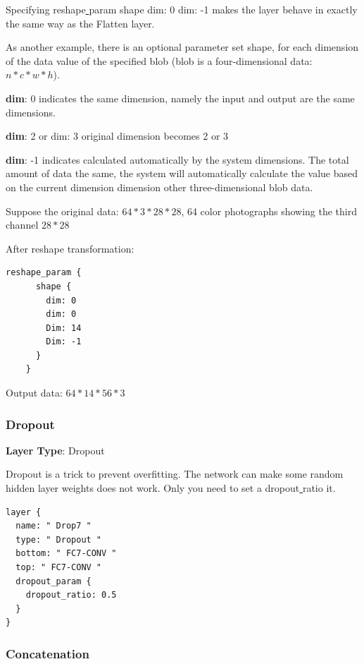 \documentclass[12pt]{article}
\begin{document}
Specifying reshape\underline{{ }{ }}param { shape { dim: 0 dim: -1 } } makes the layer behave in exactly the same way as the Flatten layer.

As another example, there is an optional parameter set shape, for each dimension of the data value of the specified blob (blob is a four-dimensional data: $n * c * w * h$).

\noindent \textbf{dim}: 0 indicates the same dimension, namely the input and output are the same dimensions.

\noindent \textbf{dim}: 2 or dim: 3 original dimension becomes 2 or 3

\noindent \textbf{dim}: -1 indicates calculated automatically by the system dimensions. The total amount of data the same, the system will automatically calculate the value based on the current dimension dimension other three-dimensional blob data.

\noindent Suppose the original data: $64 * 3 * 28 * 28$, 64 color photographs showing the third channel $28 * 28$

\noindent After reshape transformation:

\begin{lstlisting}[style=json, frame=single]
   reshape_param {
      shape {
        dim: 0
        dim: 0
        Dim: 14
        Dim: -1
      }
    }
\end{lstlisting}

\noindent Output data: $64 * 14 * 56 * 3$

\subsubsection{Dropout}

\noindent \textbf{Layer Type}: Dropout

Dropout is a trick to prevent overfitting. The network can make some random hidden layer weights does not work. Only you need to set a dropout\underline{{ }{ }}ratio it.

\begin{lstlisting}[style=json, frame=single]
layer {
  name: " Drop7 "
  type: " Dropout "
  bottom: " FC7-CONV "
  top: " FC7-CONV "
  dropout_param {
    dropout_ratio: 0.5
  }
}
\end{lstlisting}

\subsubsection{Concatenation}
\end{document}

